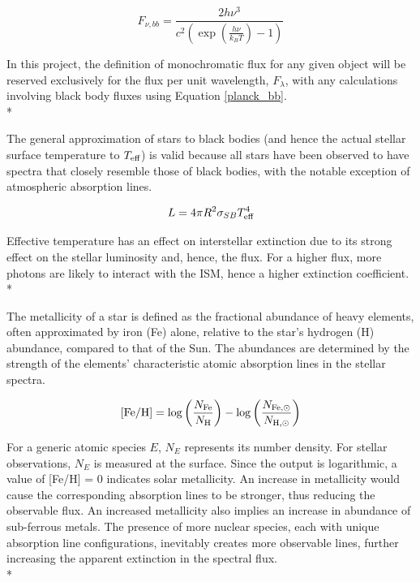 \documentclass[12pt, a4paper]{report}
\begin{document}
\begin{equation}
F_{\nu,bb} = \frac{2h\nu^{3}}{c^{2}\left(\exp\left({\frac{h\nu}{k_{B}T}}\right) - 1\right)}
\label{planck_bb_freq}
\end{equation}

In this project, the definition of monochromatic flux for any given object will be reserved exclusively for the flux per unit wavelength, $F_{\lambda}$, with any calculations involving black body fluxes using Equation \ref{planck_bb}. \\*

The general approximation of stars to black bodies (and hence the actual stellar surface temperature to $T_{\textnormal{eff}}$) is valid because all stars have been observed to have spectra that closely resemble those of black bodies, with the notable exception of atmospheric absorption lines.

\begin{equation}
L = 4 \pi R^{2} \sigma_{SB} T_{\textnormal{eff}}^{4}
\label{Teff_def}
\end{equation}

Effective temperature has an effect on interstellar extinction due to its strong effect on the stellar luminosity and, hence, the flux. For a higher flux, more photons are likely to interact with the ISM, hence a higher extinction coefficient. \\*

The metallicity of a star is defined as the fractional abundance of heavy elements, often approximated by iron (Fe) alone, relative to the star's hydrogen (H) abundance, compared to that of the Sun. The abundances are determined by the strength of the elements' characteristic atomic absorption lines in the stellar spectra.

\begin{equation}
\textnormal{[Fe/H]} = \log\left(\frac{N_{\textnormal{Fe}}}{N_{\textnormal{H}}}\right) - \log\left(\frac{N_{\textnormal{Fe},\odot}}{N_{\textnormal{H},\odot}}\right)
\label{FeH_def}
\end{equation}

For a generic atomic species $E$, $N_{E}$ represents its number density. For stellar observations, $N_{E}$ is measured at the surface. Since the output is logarithmic, a value of [Fe/H] = 0 indicates solar metallicity. An increase in metallicity would cause the corresponding absorption lines to be stronger, thus reducing the observable flux. An increased metallicity also implies an increase in abundance of sub-ferrous metals. The presence of more nuclear species, each with unique absorption line configurations, inevitably creates more observable lines, further increasing the apparent extinction in the spectral flux.\\*
\end{document}
